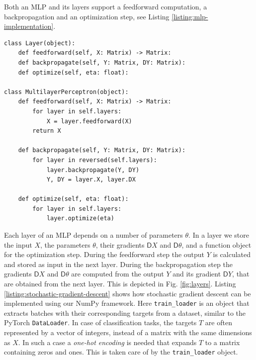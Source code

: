 \documentclass[twoside,11pt]{article}
\newcommand{\Gradient}{\textsf{D}}
\begin{document}
Both an MLP and its layers support a feedforward computation, a backpropagation and an optimization step, see Listing \ref{listing:mlp-implementation}.
\begin{lstfloat}
\begin{lstlisting}
class Layer(object):
    def feedforward(self, X: Matrix) -> Matrix:
    def backpropagate(self, Y: Matrix, DY: Matrix):
    def optimize(self, eta: float):

class MultilayerPerceptron(object):
    def feedforward(self, X: Matrix) -> Matrix:
        for layer in self.layers:
            X = layer.feedforward(X)
        return X

    def backpropagate(self, Y: Matrix, DY: Matrix):
        for layer in reversed(self.layers):
            layer.backpropagate(Y, DY)
            Y, DY = layer.X, layer.DX

    def optimize(self, eta: float):
        for layer in self.layers:
            layer.optimize(eta)
\end{lstlisting}
\caption{Multilayer perceptron implementation. Only the fundamental methods needed for the execution are given. For completeness the interface of the layer classes is added, which has the same structure. The attributes of
a layer are the input \texttt{X} and its gradient \texttt{DX}, and a function pointer \texttt{optimizer}
that takes care of the optimization step. A multilayer perceptron has only one attribute, \texttt{layers},
for storing the list of layers.
}
\label{listing:mlp-implementation}
\end{lstfloat}
Each layer of an MLP depends on a number of parameters $\theta$.
In a layer we store the input $X$, the parameters $\theta$, their gradients $\Gradient X$ and $\Gradient \theta$, and a function object for the optimization step. During the feedforward step the output $Y$ is calculated and stored as input in the next layer. During the backpropagation step the gradients $\Gradient X$ and $\Gradient \theta$ are computed from the output $Y$ and its gradient $\Gradient Y$, that are obtained from the next layer. This is depicted in Fig. \ref{fig:layers}.
Listing \ref{listing:stochastic-gradient-descent} shows how stochastic gradient descent can be implemented using our NumPy framework. Here \texttt{train\_loader} is an object that extracts batches with their corresponding targets from a dataset, similar to the PyTorch \texttt{DataLoader}.
In case of classification tasks, the targets $T$ are often represented by a vector of integers, instead of a matrix with the same dimensions as $X$. In such a case a \emph{one-hot encoding} is needed that expands $T$ to a matrix containing zeros and ones. This is taken care of by the \texttt{train\_loader} object.
\end{document}
